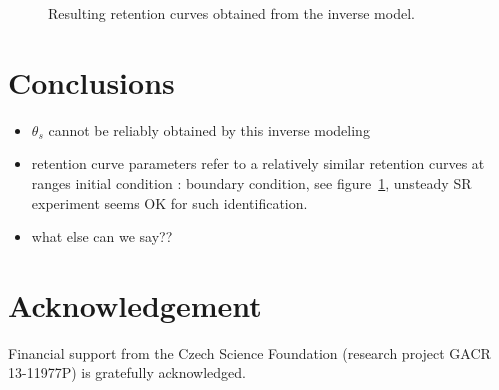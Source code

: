 \documentclass[review]{elsarticle}
\begin{document}
\begin{figure}
\label{retc-final}
\caption{Resulting retention curves obtained from the inverse model.}
\end{figure}

\section{Conclusions}
\begin{itemize}
\item $\theta_s$ cannot be reliably obtained by this inverse modeling 
\item retention curve parameters refer to a relatively similar retention curves at ranges initial condition : boundary condition, see figure~\ref{retc-final}, unsteady SR experiment seems OK for such identification.
\item  what else can we say??
\end{itemize}



\section{Acknowledgement}

Financial support from the Czech Science Foundation (research project GACR 13-11977P) is gratefully acknowledged.

\end{document}
